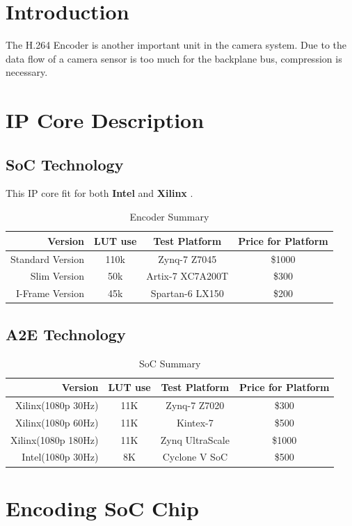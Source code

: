 \documentclass[12pt,article]{memoir}
\begin{document}
\section{Introduction}
The H.264 Encoder is another important unit in the camera system. Due to the data flow of a camera sensor is too much for the backplane bus, compression is necessary.
\section{IP Core Description}
\subsection{SoC Technology}
This IP core fit for both \textbf{Intel} and \textbf{Xilinx} \cite{ipcore:SoCTech} \cite{ipcore:A2ETech}.
\begin{table}[H]
	\centering
		\begin{tabu}{r || c | c | c }
		Version & LUT use & Test Platform & Price for Platform\\ \hline
		Standard Version & 110k & Zynq-7 Z7045 & \$1000\\
		Slim Version & 50k & Artix-7 XC7A200T & \$300\\
		I-Frame Version & 45k & Spartan-6 LX150 & \$200\\
		\end{tabu}
	\caption{Encoder Summary}
	\label{tab:encoders}
\end{table}
\subsection{A2E Technology}
\begin{table}[H]
	\centering
		\begin{tabu}{r || c | c | c }
		Version & LUT use & Test Platform & Price for Platform\\ \hline
		Xilinx(1080p 30Hz) & 11K & Zynq-7 Z7020 & \$300\\
		Xilinx(1080p 60Hz) & 11K & Kintex-7 & \$500\\
		Xilinx(1080p 180Hz) & 11K & Zynq UltraScale & \$1000\\\hline
		Intel(1080p 30Hz) & 8K & Cyclone V SoC & \$500\\
		\end{tabu}
	\caption{SoC Summary}
	\label{tab:socs}
\end{table}
\newpage
\section{Encoding SoC Chip}
\end{document}
